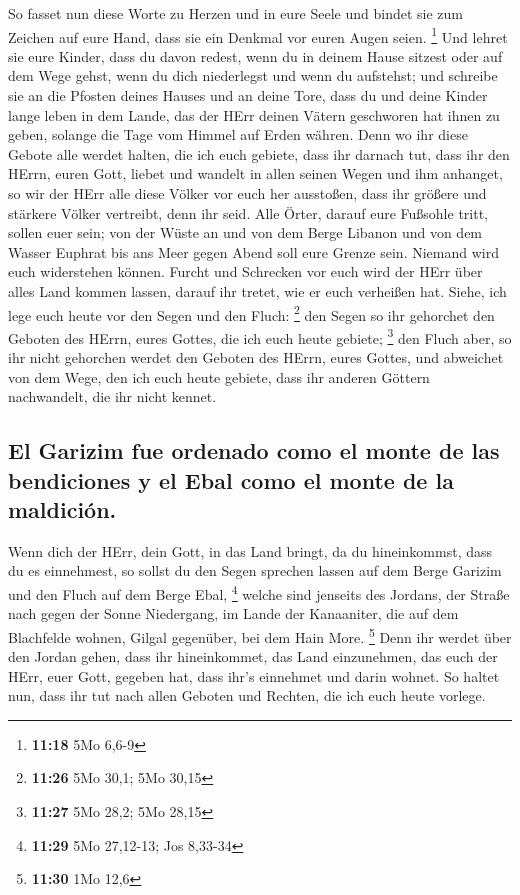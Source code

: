  So fasset nun diese Worte zu Herzen und in eure Seele
und bindet sie zum Zeichen auf eure Hand, dass sie ein Denkmal vor euren
Augen seien. \footnote{\textbf{11:18} 5Mo 6,6-9}  Und
lehret sie eure Kinder, dass du davon redest, wenn du in deinem Hause
sitzest oder auf dem Wege gehst, wenn du dich niederlegst und wenn du
aufstehst;  und schreibe sie an die Pfosten deines Hauses
und an deine Tore,  dass du und deine Kinder lange leben
in dem Lande, das der HErr deinen Vätern geschworen hat ihnen zu geben,
solange die Tage vom Himmel auf Erden währen.  Denn wo
ihr diese Gebote alle werdet halten, die ich euch gebiete, dass ihr
darnach tut, dass ihr den HErrn, euren Gott, liebet und wandelt in allen
seinen Wegen und ihm anhanget,  so wir der HErr alle
diese Völker vor euch her ausstoßen, dass ihr größere und stärkere
Völker vertreibt, denn ihr seid.  Alle Örter, darauf eure
Fußsohle tritt, sollen euer sein; von der Wüste an und von dem Berge
Libanon und von dem Wasser Euphrat bis ans Meer gegen Abend soll eure
Grenze sein.  Niemand wird euch widerstehen können.
Furcht und Schrecken vor euch wird der HErr über alles Land kommen
lassen, darauf ihr tretet, wie er euch verheißen hat. 
Siehe, ich lege euch heute vor den Segen und den Fluch: \footnote{\textbf{11:26}
  5Mo 30,1; 5Mo 30,15}  den Segen so ihr gehorchet den
Geboten des HErrn, eures Gottes, die ich euch heute gebiete; \footnote{\textbf{11:27}
  5Mo 28,2; 5Mo 28,15}  den Fluch aber, so ihr nicht
gehorchen werdet den Geboten des HErrn, eures Gottes, und abweichet von
dem Wege, den ich euch heute gebiete, dass ihr anderen Göttern
nachwandelt, die ihr nicht kennet.

\hypertarget{el-garizim-fue-ordenado-como-el-monte-de-las-bendiciones-y-el-ebal-como-el-monte-de-la-maldiciuxf3n.}{%
\subsection{El Garizim fue ordenado como el monte de las bendiciones y
el Ebal como el monte de la
maldición.}\label{el-garizim-fue-ordenado-como-el-monte-de-las-bendiciones-y-el-ebal-como-el-monte-de-la-maldiciuxf3n.}}

 Wenn dich der HErr, dein Gott, in das Land bringt, da du
hineinkommst, dass du es einnehmest, so sollst du den Segen sprechen
lassen auf dem Berge Garizim und den Fluch auf dem Berge Ebal,
\footnote{\textbf{11:29} 5Mo 27,12-13; Jos 8,33-34} 
welche sind jenseits des Jordans, der Straße nach gegen der Sonne
Niedergang, im Lande der Kanaaniter, die auf dem Blachfelde wohnen,
Gilgal gegenüber, bei dem Hain More. \footnote{\textbf{11:30} 1Mo 12,6}
 Denn ihr werdet über den Jordan gehen, dass ihr
hineinkommet, das Land einzunehmen, das euch der HErr, euer Gott,
gegeben hat, dass ihr's einnehmet und darin wohnet.  So
haltet nun, dass ihr tut nach allen Geboten und Rechten, die ich euch
heute vorlege.

